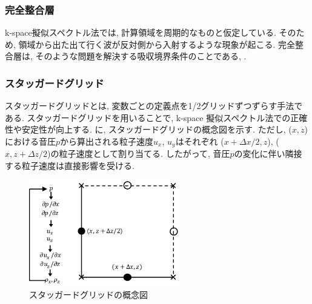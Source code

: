 \subsubsection{完全整合層}
k-space擬似スペクトル法では, 計算領域を周期的なものと仮定している. そのため, 領域から出た出て行く波が反対側から入射するような現象が起こる. 完全整合層は, そのような問題を解決する吸収境界条件のことである\cite{hayashisan[38]}, \cite{hayashisan[39]}. 
\subsubsection{スタッガードグリッド}
スタッガードグリッドとは, 変数ごとの定義点を1/2グリッドずつずらす手法である. スタッガードグリッドを用いることで, k-space 擬似スペクトル法での正確性や安定性が向上する\cite{hayashisan[42]}. に, スタッガードグリッドの概念図を示す. ただし, ($x, z$) における音圧$p$から算出される粒子速度$u_x$, $u_y$はそれぞれ ($x+\Delta x /2, z$),  ($x, z + \Delta z /2$)の粒子速度として割り当てる. したがって, 音圧$p$の変化に伴い隣接する粒子速度は直接影響を受ける. 
\begin{figure}[h]
  \begin{center}
    \includegraphics[width=65mm]{fig/stagado.pdf}
  \end{center}
  \caption{スタッガードグリッドの概念図}
\end{figure}
